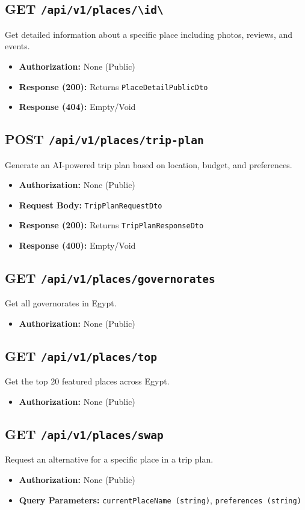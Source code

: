 \subsection{GET \texttt{/api/v1/places/\textbackslash{}{id\textbackslash{}}}}
Get detailed information about a specific place including photos, reviews, and events.
\begin{itemize}
    \item \textbf{Authorization:} None (Public)
    \item \textbf{Response (200):} Returns \texttt{PlaceDetailPublicDto}
    \item \textbf{Response (404):} Empty/Void
\end{itemize}

\subsection{POST \texttt{/api/v1/places/trip-plan}}
Generate an AI-powered trip plan based on location, budget, and preferences.
\begin{itemize}
    \item \textbf{Authorization:} None (Public)
    \item \textbf{Request Body:} \texttt{TripPlanRequestDto}
    \item \textbf{Response (200):} Returns \texttt{TripPlanResponseDto}
    \item \textbf{Response (400):} Empty/Void
\end{itemize}

\subsection{GET \texttt{/api/v1/places/governorates}}
Get all governorates in Egypt.
\begin{itemize}
    \item \textbf{Authorization:} None (Public)
\end{itemize}

\subsection{GET \texttt{/api/v1/places/top}}
Get the top 20 featured places across Egypt.
\begin{itemize}
    \item \textbf{Authorization:} None (Public)
\end{itemize}

\subsection{GET \texttt{/api/v1/places/swap}}
Request an alternative for a specific place in a trip plan.
\begin{itemize}
    \item \textbf{Authorization:} None (Public)
    \item \textbf{Query Parameters:} \texttt{currentPlaceName (string)}, \texttt{preferences (string)}
\end{itemize}


